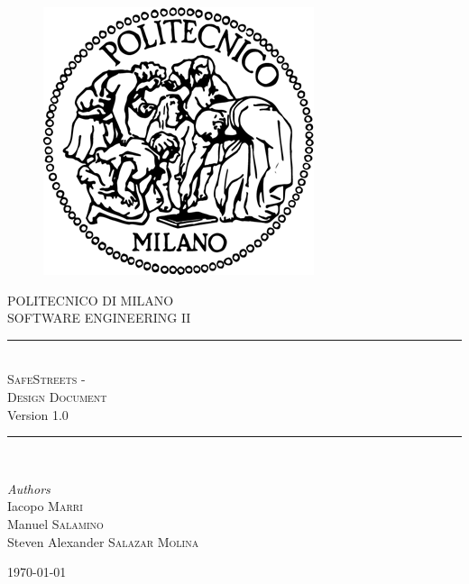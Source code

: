 \documentclass[11pt,a4paper]{article}
\begin{document}
\begin{figure}[t]
    \includegraphics[scale=0.8]{Images/logo_polimi.png}
    \centering
\end{figure}

\begin{titlepage}
    \newcommand{\HRule}{\rule{\linewidth}{0.5mm}}
    \center
    \textsc{\LARGE POLITECNICO DI MILANO}\\[1.5cm]
	
	\textsc{\Large SOFTWARE ENGINEERING II}\\[0.5cm]
	
	\HRule\\[0.4cm]
	    {\huge \textsc{SafeStreets - \\Design Document}}\\[0.4cm]
	    Version 1.0
    \HRule\\[1.5cm]
	
	\begin{minipage}{1\textwidth}
		\begin{flushleft}
			\large
			\textit{Authors}\\
			Iacopo \textsc{Marri}\\
			Manuel \textsc{Salamino}\\
			Steven Alexander \textsc{Salazar Molina}
		\end{flushleft}
	\end{minipage}
	
	\vfill\vfill\vfill %
	
	{\large\today}
	
\end{titlepage}


\newpage

\tableofcontents








%
\end{document}
